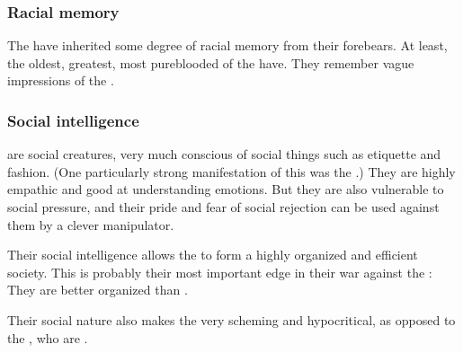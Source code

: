 \subsubsection{Racial memory}
The \resphain{} have inherited some degree of racial memory from their \SitraAchra forebears. 
At least, the oldest, greatest, most pureblooded of the \resphain{} have. 
They remember vague impressions of the . 





\subsubsection{Social intelligence}
\Resphain{} are social creatures, very much conscious of social things such as etiquette and fashion. 
(One particularly strong manifestation of this was the \CiriathSepher{} .)
They are highly empathic and good at understanding emotions. 
But they are also vulnerable to social pressure, and their pride and fear of social rejection can be used against them by a clever manipulator. 

Their social intelligence allows the \resphain{} to form a highly organized and efficient society. 
This is probably their most important edge in their war against the \dragons: 
They are better organized than . 

Their social nature also makes the \resphain{} very scheming and hypocritical, as opposed to the \dragons, who are . 





